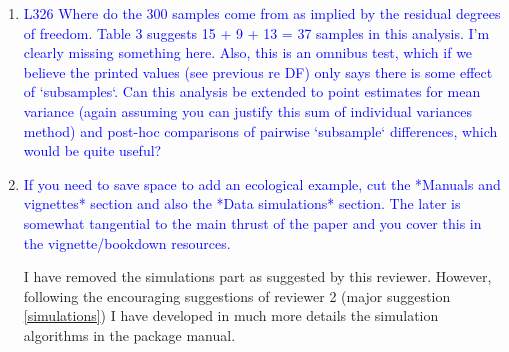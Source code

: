 \documentclass[12pt,letterpaper]{article}
\begin{document}
\begin{enumerate}

\item{\textcolor{blue}{L326 Where do the 300 samples come from as implied by the residual degrees of freedom. Table 3 suggests 15 + 9 + 13 = 37 samples in this analysis. I'm clearly missing something here. Also, this is an omnibus test, which if we believe the printed values (see previous re DF) only says there is some effect of `subsamples`. Can this analysis be extended to point estimates for mean variance (again assuming you can justify this sum of individual variances method) and post-hoc comparisons of pairwise `subsample` differences, which would be quite useful?}}


\item{\textcolor{blue}{If you need to save space to add an ecological example, cut the *Manuals and vignettes* section and also the *Data simulations* section. The later is somewhat tangential to the main thrust of the paper and you cover this in the vignette/bookdown resources.}}
\label{remove_simulations}

I have removed the simulations part as suggested by this reviewer.
However, following the encouraging suggestions of reviewer 2 (major suggestion \ref{simulations}) I have developed in much more details the simulation algorithms in the package manual.

\end{enumerate}
\end{document}
